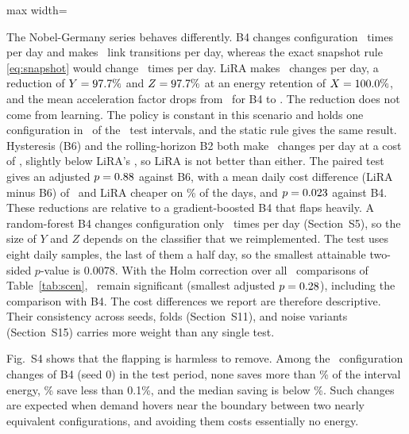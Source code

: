 \documentclass[5p,times]{elsarticle}
\begin{document}
\begin{table}[t]
\centering
\caption{Main Comparison in the Base Scenario (Test Split). Means with 95\% Confidence Intervals over Five Seeds for B4, B6, B7, and LiRA; Single Values Otherwise. Latency Is the Median Decision Time}
\label{tab:main}
\footnotesize
\setlength{\tabcolsep}{4pt}
\begin{adjustbox}{max width=\linewidth}\end{adjustbox}
\end{table}

The Nobel-Germany series behaves differently. B4 changes configuration \nobBFourchg\ times per day and makes \nobBFourtrans\ link transitions per day, whereas the exact snapshot rule \eqref{eq:snapshot} would change \nobSnapChg\ times per day. LiRA makes \nobLiRAchg\ changes per day, a reduction of $Y=97.7\%$ and $Z=97.7\%$ at an energy retention of $X=100.0\%$, and the mean acceleration factor drops from \nobAFfour\ for B4 to \nobAFlira. The reduction does not come from learning. The policy is constant in this scenario and holds one configuration in \liraHold\ of the \nobTestIntervals\ test intervals, and the static rule gives the same result. Hysteresis (B6) and the rolling-horizon B2 both make \nobBsixChg\ changes per day at a cost of \nobJBsixbase, slightly below LiRA's \nobJLiRAbase, so LiRA is not better than either. The paired test gives an adjusted $p=0.88$ against B6, with a mean daily cost difference (LiRA minus B6) of \effBsixbase\ and LiRA cheaper on \effBsixDaysbase\% of the days, and $p=0.023$ against B4. These reductions are relative to a gradient-boosted B4 that flaps heavily. A random-forest B4 changes configuration only \modRfChg\ times per day (Section~S5), so the size of $Y$ and $Z$ depends on the classifier that we reimplemented. The test uses eight daily samples, the last of them a half day, so the smallest attainable two-sided $p$-value is $0.0078$. With the Holm correction over all \globalTests\ comparisons of Table~\ref{tab:scen}, \globalSig\ remain significant (smallest adjusted $p=0.28$), including the comparison with B4. The cost differences we report are therefore descriptive. Their consistency across seeds, folds (Section~S11), and noise variants (Section~S15) carries more weight than any single test.

Fig.~S4 shows that the flapping is harmless to remove. Among the \gainChanges\ configuration changes of B4 (seed 0) in the test period, none saves more than \gainMax\% of the interval energy, \gainTenthShare\% save less than 0.1\%, and the median saving is below \gainMedianBelow\%. Such changes are expected when demand hovers near the boundary between two nearly equivalent configurations, and avoiding them costs essentially no energy.
\end{document}
